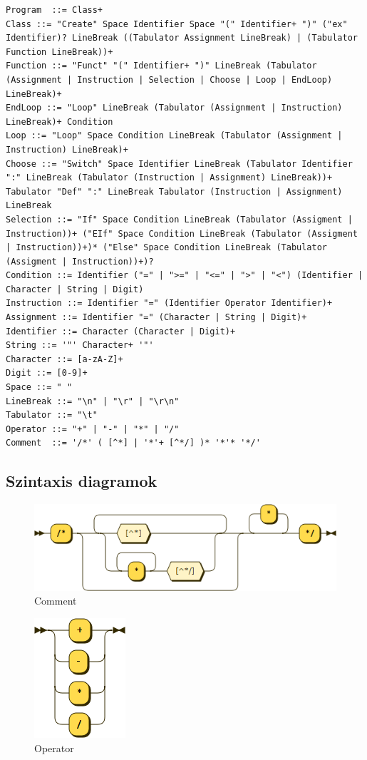 \begin{verbatim}
Program  ::= Class+
Class ::= "Create" Space Identifier Space "(" Identifier+ ")" ("ex" Identifier)? LineBreak ((Tabulator Assignment LineBreak) | (Tabulator Function LineBreak))+
Function ::= "Funct" "(" Identifier+ ")" LineBreak (Tabulator (Assignment | Instruction | Selection | Choose | Loop | EndLoop) LineBreak)+
EndLoop ::= "Loop" LineBreak (Tabulator (Assignment | Instruction) LineBreak)+ Condition
Loop ::= "Loop" Space Condition LineBreak (Tabulator (Assignment | Instruction) LineBreak)+
Choose ::= "Switch" Space Identifier LineBreak (Tabulator Identifier ":" LineBreak (Tabulator (Instruction | Assignment) LineBreak))+ Tabulator "Def" ":" LineBreak Tabulator (Instruction | Assignment) LineBreak
Selection ::= "If" Space Condition LineBreak (Tabulator (Assigment | Instruction))+ ("EIf" Space Condition LineBreak (Tabulator (Assigment | Instruction))+)* ("Else" Space Condition LineBreak (Tabulator (Assigment | Instruction))+)?
Condition ::= Identifier ("=" | ">=" | "<=" | ">" | "<") (Identifier | Character | String | Digit)
Instruction ::= Identifier "=" (Identifier Operator Identifier)+
Assignment ::= Identifier "=" (Character | String | Digit)+
Identifier ::= Character (Character | Digit)+
String ::= '"' Character+ '"'
Character ::= [a-zA-Z]+
Digit ::= [0-9]+
Space ::= " "
LineBreak ::= "\n" | "\r" | "\r\n"
Tabulator ::= "\t"
Operator ::= "+" | "-" | "*" | "/"
Comment  ::= '/*' ( [^*] | '*'+ [^*/] )* '*'* '*/'
\end{verbatim}

\subsection{Szintaxis diagramok}

\begin{figure}[h!]
\centering
\includegraphics[scale=0.5]{kepek/rr_comment.png}
\caption{Comment}
\label{fig:rr_comment}
\end{figure}

\begin{figure}[h!]
\centering
\includegraphics[scale=1]{kepek/rr_operator.png}
\caption{Operator}
\label{fig:rr_operator}
\end{figure}

